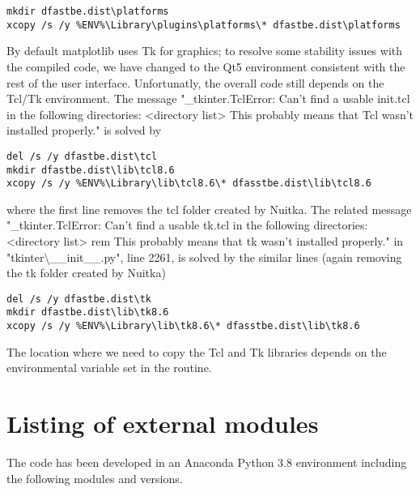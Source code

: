 \begin{Verbatim}
mkdir dfastbe.dist\platforms
xcopy /s /y %ENV%\Library\plugins\platforms\* dfastbe.dist\platforms
\end{Verbatim}

By default matplotlib uses Tk for graphics; to resolve some stability issues with the compiled code, we have changed to the Qt5 environment consistent with the rest of the user interface.
Unfortunatly, the overall code still depends on the Tcl/Tk environment.
The message "\_tkinter.TclError: Can't find a usable init.tcl in the following directories: <directory list> This probably means that Tcl wasn't installed properly." is solved by

\begin{Verbatim}
del /s /y dfastbe.dist\tcl
mkdir dfastbe.dist\lib\tcl8.6
xcopy /s /y %ENV%\Library\lib\tcl8.6\* dfasstbe.dist\lib\tcl8.6
\end{Verbatim}

where the first line removes the tcl folder created by Nuitka.
The related message "\_tkinter.TclError: Can't find a usable tk.tcl in the following directories: <directory list> rem This probably means that tk wasn't installed properly." in "tkinter\textbackslash{}\_\_init\_\_.py", line 2261, is solved by the similar lines (again removing the tk folder created by Nuitka)

\begin{Verbatim}
del /s /y dfastbe.dist\tk
mkdir dfastbe.dist\lib\tk8.6
xcopy /s /y %ENV%\Library\lib\tk8.6\* dfasstbe.dist\lib\tk8.6
\end{Verbatim}

The location where we need to copy the Tcl and Tk libraries depends on the environmental variable  set in the  routine.

\section{Listing of external modules}

The code has been developed in an Anaconda Python 3.8 environment including the following modules and versions.


